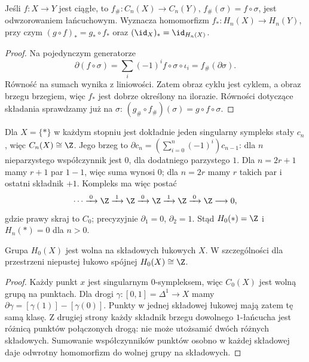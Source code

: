 \begin{stwierdzenie}
\label{prop:funktor-singularny}
Jeśli $f:X\to Y$ jest ciągłe, to
$f_\#:C_n(X)\to C_n(Y)$,
$f_\#(\sigma)=f\circ\sigma$,
jest odwzorowaniem łańcuchowym. Wyznacza homomorfizm
$f_*:H_n(X)\to H_n(Y)$, przy czym
$(g\circ f)_*=g_*\circ f_*$ oraz
$(\id_X)_*=\id_{H_n(X)}$.
\end{stwierdzenie}
\begin{proof}
Na pojedynczym generatorze
\[
 \partial(f\circ\sigma)
 =\sum_i(-1)^i f\circ\sigma\circ\iota_i
 =f_\#(\partial\sigma).
\]
Równość na sumach wynika z liniowości.
Zatem obraz cyklu jest cyklem, a obraz
brzegu brzegiem, więc $f_*$ jest
dobrze określony na ilorazie.
Równości dotyczące składania sprawdzamy
już na $\sigma$:
$(g_\#\circ f_\#)(\sigma)=g\circ f\circ\sigma$.
\end{proof}

\begin{przyklad}[Punkt]
\label{prz:homologia-punktu}
Dla $X=\{*\}$ w każdym stopniu jest
dokładnie jeden singularny sympleks
stały $c_n$, więc $C_n(X)\cong\Z$.
Jego brzeg to
$\partial c_n=(\sum_{i=0}^n(-1)^i)c_{n-1}$:
dla $n$ nieparzystego współczynnik
jest $0$, dla dodatniego parzystego $1$.
Dla $n=2r+1$ mamy $r+1$ par $1-1$, więc suma wynosi $0$;
dla $n=2r$ mamy $r$ takich par i ostatni składnik $+1$.
Kompleks ma więc postać
\[
 \cdots\xrightarrow{\;0\;}\Z
 \xrightarrow{\;1\;}\Z
 \xrightarrow{\;0\;}\Z
 \xrightarrow{\;1\;}\Z
 \xrightarrow{\;0\;}\Z\longrightarrow0,
\]
gdzie prawy skraj to $C_0$; precyzyjnie
$\partial_1=0$, $\partial_2=1$.
Stąd $H_0(*)=\Z$ i $H_n(*)=0$ dla $n>0$.
\end{przyklad}

\begin{stwierdzenie}
\label{prop:h0-singularne}
Grupa $H_0(X)$ jest wolna na składowych
łukowych $X$. W szczególności
dla przestrzeni niepustej łukowo spójnej
$H_0(X)\cong\Z$.
\end{stwierdzenie}
\begin{proof}
Każdy punkt $x$ jest singularnym
$0$-sympleksem, więc $C_0(X)$
jest wolną grupą na punktach.
Dla drogi $\gamma:[0,1]=\Delta^1\to X$
mamy $\partial\gamma=[\gamma(1)]-
[\gamma(0)]$. Punkty w jednej składowej
łukowej mają zatem tę samą klasę.
Z drugiej strony każdy składnik
brzegu dowolnego $1$-łańcucha
jest różnicą punktów połączonych drogą:
nie może utożsamić dwóch różnych
składowych. Sumowanie współczynników
punktów osobno w każdej składowej
daje odwrotny homomorfizm do
wolnej grupy na składowych.
\end{proof}

